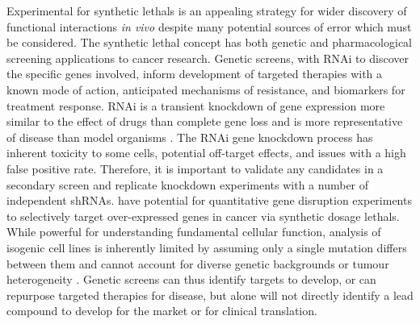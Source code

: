 Experimental  for \glspl{synthetic lethal} is an appealing strategy for wider discovery of functional interactions \textit{in vivo} despite many potential sources of error which must be considered. The \gls{synthetic lethal} concept has both genetic and pharmacological screening applications to cancer research. Genetic screens, with \gls{RNAi} to discover the specific genes involved, inform development of targeted therapies with a known mode of action, anticipated mechanisms of resistance, and biomarkers for treatment response. \gls{RNAi} is a transient knockdown of \gls{gene expression} more similar to the effect of drugs than complete gene loss and is more representative of disease than model organisms \citep{Bussey2006}. The \gls{RNAi} gene knockdown process has inherent toxicity to some cells, potential off-target effects, and issues with a high false positive rate. Therefore, it is important to validate any candidates in a secondary screen and replicate knockdown experiments with a number of independent \glspl{shRNA}. 
 have potential for quantitative gene disruption experiments to selectively target over-expressed genes in cancer via \glspl{synthetic dosage lethal}. While powerful for understanding fundamental cellular function, analysis of isogenic cell lines is inherently limited by assuming only a single \gls{mutation} differs between them and cannot account for diverse genetic backgrounds or tumour heterogeneity \citep{Fece2015}. Genetic screens can thus identify targets to develop, or can repurpose targeted therapies for disease, but alone will not directly identify a lead compound to develop for the market or for clinical translation.  

